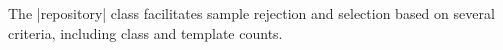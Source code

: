 The |repository| class facilitates sample rejection and selection based on
several criteria, including class and template counts.

